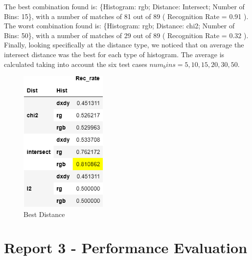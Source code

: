 \documentclass[
	12pt, %
]{fphw}
\begin{document}
The best combination found is: \{Histogram: rgb; Distance: Intersect; Number of Bins: 15\}, with a number of matches of 81 out of 89 ( Recognition Rate = 0.91 ).\\ 

The worst combination found is: \{Histogram: rgb; Distance: chi2; Number of Bins: 50\}, with a number of matches of 29 out of 89 ( Recognition Rate = 0.32 ).\\

Finally, looking specifically at the distance type, we noticed that on average the intersect distance was the best for each type of histogram.
The average is calculated taking into account the six test cases \(num_bins = 5, 10, 15, 20, 30, 50\).

\begin{figure}[h!]
    \centering
    \includegraphics[height=2.8in]{img/best_dist.png}
     \caption{Best Distance}
\end{figure}



\newpage
\section*{Report 3 - Performance Evaluation}
\end{document}
